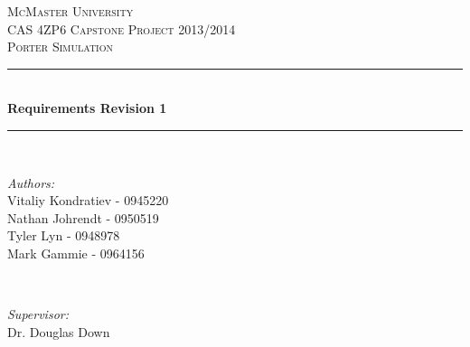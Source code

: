 \documentclass[paper=letter, fontsize=10pt]{scrartcl}
\numberwithin{equation}{section}		%
\numberwithin{figure}{section}			%
\numberwithin{table}{section}				%
\begin{document}
\begin{titlepage}

\newcommand{\HRule}{\rule{\linewidth}{0.5mm}} %

\begin{center}
 

\textsc{\LARGE McMaster University}\\[1.5cm] %
\textsc{\Large CAS 4ZP6 Capstone Project 2013/2014}\\[0.5cm] %
\textsc{\large Porter Simulation}\\[0.5cm] %


\HRule \\[0.4cm]
{ \huge \bfseries Requirements Revision 1}\\[0.4cm] %
\HRule \\[1.5cm]
 

\begin{minipage}{0.4\textwidth}
\begin{flushleft} \large
\emph{Authors:}\\
Vitaliy Kondratiev - 0945220\\
Nathan Johrendt - 0950519\\
Tyler Lyn - 0948978\\
Mark Gammie - 0964156
\end{flushleft}
\end{minipage}
~
\begin{minipage}{0.4\textwidth}
\begin{flushright} \large
\emph{Supervisor:} \\
Dr. Douglas Down %
\end{flushright}
\end{minipage}\\[4cm]


\end{center}
\end{titlepage}
\end{document}
